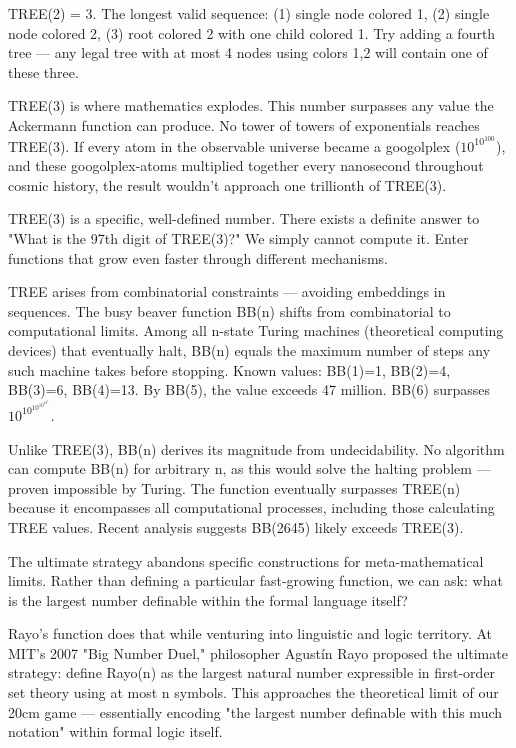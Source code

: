 TREE(2) = 3. The longest valid sequence: (1) single node colored 1, (2) single node colored 2, (3) root colored 2 with one child colored 1. Try adding a fourth tree — any legal tree with at most 4 nodes using colors {1,2} will contain one of these three.

TREE(3) is where mathematics explodes. This number surpasses any value the Ackermann function can produce. No tower of towers of exponentials reaches TREE(3). If every atom in the observable universe became a googolplex ($10^{10^{100}}$), and these googolplex-atoms multiplied together every nanosecond throughout cosmic history, the result wouldn't approach one trillionth of TREE(3).

TREE(3) is a specific, well-defined number. There exists a definite answer to "What is the 97th digit of TREE(3)?" We simply cannot compute it. Enter functions that grow even faster through different mechanisms.

TREE arises from combinatorial constraints — avoiding embeddings in sequences. The busy beaver function BB(n) shifts from combinatorial to computational limits. Among all n-state Turing machines (theoretical computing devices) that eventually halt, BB(n) equals the maximum number of steps any such machine takes before stopping. Known values: BB(1)=1, BB(2)=4, BB(3)=6, BB(4)=13. By BB(5), the value exceeds 47 million. BB(6) surpasses $10^{10^{10^{10^{10^7}}}}$.

Unlike TREE(3), BB(n) derives its magnitude from undecidability. No algorithm can compute BB(n) for arbitrary n, as this would solve the halting problem — proven impossible by Turing. The function eventually surpasses TREE(n) because it encompasses all computational processes, including those calculating TREE values. Recent analysis suggests BB(2645) likely exceeds TREE(3).

The ultimate strategy abandons specific constructions for meta-mathematical limits. Rather than defining a particular fast-growing function, we can ask: what is the largest number definable within the formal language itself?

Rayo's function does that while venturing into linguistic and logic territory. At MIT's 2007 "Big Number Duel," philosopher Agustín Rayo proposed the ultimate strategy: define Rayo(n) as the largest natural number expressible in first-order set theory using at most n symbols. This approaches the theoretical limit of our 20cm game — essentially encoding "the largest number definable with this much notation" within formal logic itself. 

